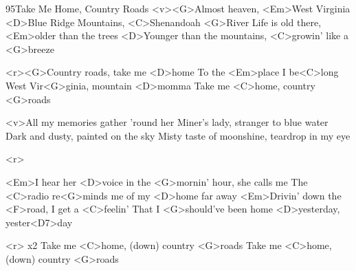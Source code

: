 \begin{song}{95}{Take Me Home, Country Roads}{}
	<v><G>Almost heaven, <Em>West Virginia
	<D>Blue Ridge Mountains, <C>Shenandoah <G>River
	Life is old there, <Em>older than the trees
	<D>Younger than the mountains, <C>growin' like a <G>breeze

	<r><G>Country roads, take me <D>home
	To the <Em>place I be<C>long
	West Vir<G>ginia, mountain <D>momma
	Take me <C>home, country <G>roads

	<v>All my memories gather 'round her
	Miner's lady, stranger to blue water
	Dark and dusty, painted on the sky
	Misty taste of moonshine, teardrop in my eye

	<r>

	<Em>I hear her <D>voice in the <G>mornin' hour, she calls me
	The <C>radio re<G>minds me of my <D>home far away
	<Em>Drivin' down the <F>road, I get a <C>feelin'
	That I <G>should've been home <D>yesterday, yester<D7>day

	<r> x2
	Take me <C>home, (down) country <G>roads
	Take me <C>home, (down) country <G>roads
\end{song}

